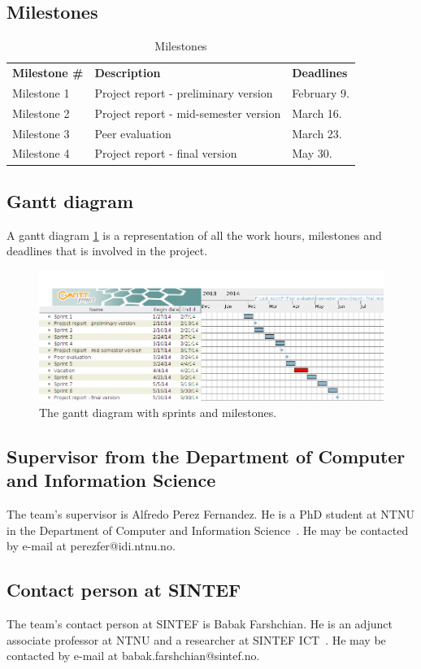 \subsection{Milestones}
\begin{table}[H]
\centering
{}
\begin{tabular}{|l|l|l|}
\hline
\textbf{Milestone \#} & \textbf{Description} & \textbf{Deadlines}\\
Milestone 1& Project report - preliminary version & February 9. \\
Milestone 2 & Project report - mid-semester version & March 16.  \\
Milestone 3 & Peer evaluation & March 23.  \\
 Milestone 4 & Project report - final version & May 30.\\\hline
\end{tabular}
\caption{Milestones}
\end{table}

\subsection{Gantt diagram}

A gantt diagram \ref{fig:gantt} is a representation of all the work hours, milestones and deadlines that is involved in the project. 

\begin{figure}[H]
\includegraphics[width=\textwidth]{ch/projectPlan/fig/gantt.png}
\caption{The gantt diagram with sprints and milestones.}
\label{fig:gantt}
\end{figure}

\subsection{Supervisor from the Department of Computer and Information Science}
The team's supervisor is Alfredo Perez Fernandez. He is a PhD student at NTNU in the Department of Computer and Information Science~\cite{idi}. He may be contacted by e-mail at perezfer@idi.ntnu.no.

\subsection{Contact person at SINTEF}
The team's contact person at SINTEF is Babak Farshchian. He is an adjunct associate professor at NTNU and a researcher at SINTEF ICT~\cite{sintefict}. He may be contacted by e-mail at babak.farshchian@sintef.no.
